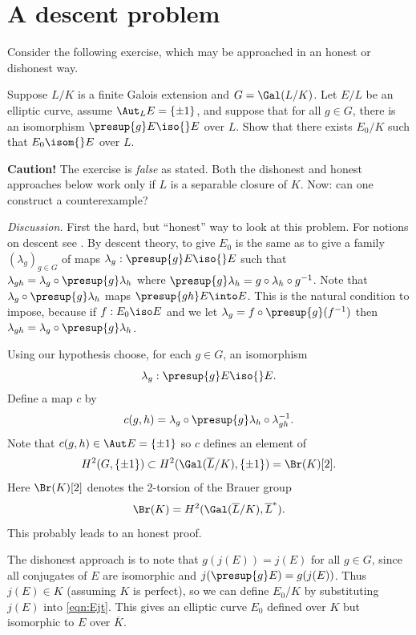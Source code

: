 \documentclass{report}
\begin{document}
\section{A descent problem}
Consider the following exercise, which may be approached in
an honest or dishonest way.
\begin{exercise}
Suppose $L/K$ is a finite Galois extension and $G=\Gal(L/K)$.
Let $E/L$ be an elliptic curve, assume $\Aut_L{E}=\{\pm 1\}$,
and suppose that for all $g\in{}G$, there is an
isomorphism $\presup{g}E\iso{}E$ over $L$. Show that
there exists $E_0/K$ such that $E_0\isom{}E$ over $L$.
\end{exercise}
{\bfseries Caution!} The exercise is {\em false} as stated.
Both the dishonest and honest approaches below work only if
$L$ is a separable closure of $K$. Now: can one construct
a counterexample?

{\em Discussion.}
First the hard, but ``honest'' way to look at this problem.
For notions on descent see
\cite[V.20]{serre:alggroups}.
By descent theory, to give $E_0$ is the same as to
give a family $(\lambda_g)_{g\in{}G}$ of maps
$\lambda_{g}:\presup{g}E\iso{}E$ such that
$\lambda_{gh}=\lambda_{g}\circ\presup{g}\lambda_h$
where $\presup{g}\lambda_h=g\circ\lambda_h\circ{}g^{-1}$.
Note that $\lambda_{g}\circ\presup{g}\lambda_h$
maps $\presup{gh}E\into E$.
This is the natural condition to impose, because if
$f:E_0\iso E$ and we let $\lambda_g=f\circ\presup{g}(f^{-1})$
then $\lambda_{gh}=\lambda_{g}\circ\presup{g}\lambda_h$.

Using our hypothesis choose, for each $g\in G$, an isomorphism
$$\lambda_{g}:\presup{g}E\iso{}E.$$ Define a map $c$
by $$c(g,h)=\lambda_g\circ\presup{g}\lambda_h\circ\lambda_{gh}^{-1}.$$
Note that $c(g,h)\in\Aut E=\{\pm 1\}$ so $c$ defines an
element of
$$H^2(G,\{\pm 1\})\subset H^2(\Gal(\overline{L}/K),\{\pm 1\})
=\Br(K)[2].$$
Here $\Br(K)[2]$ denotes the 2-torsion of the Brauer group
$$\Br(K)=H^2(\Gal(\overline{L}/K),\overline{L}^{*}).$$
This probably leads to an honest proof.

The dishonest approach is to note that $g(j(E))=j(E)$ for all
$g\in{}G$, since all conjugates of $E$ are isomorphic
and $j(\presup{g}E)=g(j(E))$. Thus $j(E)\in K$ (assuming $K$
is perfect), so we
can define $E_0/K$ by substituting $j(E)$ into \eqref{eqn:Ejt}. This
gives an elliptic curve $E_0$ defined over $K$ but isomorphic
to $E$ over $\overline{K}$.

\end{document}
